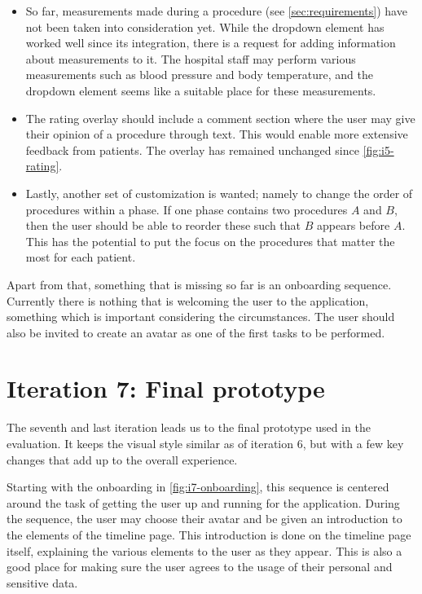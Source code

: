 \begin{itemize}
    \item So far, measurements made during a procedure (see \autoref{sec:requirements}) have not been taken into consideration yet. While the dropdown element has worked well since its integration, there is a request for adding information about measurements to it. The hospital staff may perform various measurements such as blood pressure and body temperature, and the dropdown element seems like a suitable place for these measurements.

    \item The rating overlay should include a comment section where the user may give their opinion of a procedure through text. This would enable more extensive feedback from patients. The overlay has remained unchanged since \autoref{fig:i5-rating}.
    
    \item Lastly, another set of customization is wanted; namely to change the order of procedures within a phase. If one phase contains two procedures $A$ and $B$, then the user should be able to reorder these such that $B$ appears before $A$. This has the potential to put the focus on the procedures that matter the most for each patient.
\end{itemize}

Apart from that, something that is missing so far is an onboarding sequence. Currently there is nothing that is welcoming the user to the application, something which is important considering the circumstances. The user should also be invited to create an avatar as one of the first tasks to be performed.

\section{Iteration 7: Final prototype}
\label{sec:iteration7}

The seventh and last iteration leads us to the final prototype used in the evaluation. It keeps the visual style similar as of iteration 6, but with a few key changes that add up to the overall experience.

Starting with the onboarding in \autoref{fig:i7-onboarding}, this sequence is centered around the task of getting the user up and running for the application. During the sequence, the user may choose their avatar and be given an introduction to the elements of the timeline page. This introduction is done on the timeline page itself, explaining the various elements to the user as they appear. This is also a good place for making sure the user agrees to the usage of their personal and sensitive data.

